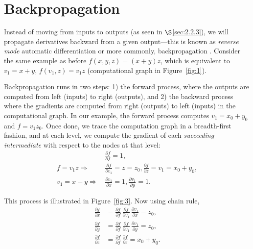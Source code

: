 \section{Backpropagation}
\label{sec:3}

Instead of moving from inputs to outputs (as seen in $\S$\ref{sec:2.2.3}), we will propagate derivatives backward from a given output---this is known as \textit{reverse mode} automatic differentiation or more commonly, backpropagation \cite{goodfellow2016deep,baydin2018automatic}. Consider the same example as before $f(x, y, z) = (x + y) z$, which is equivalent to $v_1 = x + y$, $f(v_1, z) = v_1 z$ (computational graph in Figure~\ref{fig:1}).

Backpropagation runs in two steps: 1) the forward process, where the outputs are computed from left (inputs) to right (outputs), and 2) the backward process where the gradients are computed from right (outputs) to left (inputs) in the computational graph. In our example, the forward process computes $v_1 = x_0 + y_0$ and $f = v_1 z_0$. Once done, we trace the computation graph in a breadth-first fashion, and at each level, we compute the gradient of each \textit{succeeding intermediate} with respect to the nodes at that level:
\begin{align*}
    &\frac{\partial f}{\partial f} = 1, \\
    f = v_1 z \Rightarrow\, & \frac{\partial f}{\partial v_1} = z = z_0, \frac{\partial f}{\partial z} = v_1 = x_0 + y_0, \\
    v_1 = x + y \Rightarrow\, & \frac{\partial v_1}{\partial x} = 1, \frac{\partial v_1}{\partial y} = 1.
\end{align*}

This process is illustrated in Figure~\ref{fig:3}. Now using chain rule, 
\begin{align*}
    \frac{\partial f}{\partial x} &= \frac{\partial f}{\partial f}\, \frac{\partial f}{\partial v_1}\, \frac{\partial v_1}{\partial x} = z_0, \\
    \frac{\partial f}{\partial y} &= \frac{\partial f}{\partial f}\, \frac{\partial f}{\partial v_1}\, \frac{\partial v_1}{\partial y} = z_0, \\
    \frac{\partial f}{\partial z} &= \frac{\partial f}{\partial f}\, \frac{\partial f}{\partial z} = x_0 + y_0.
\end{align*}

